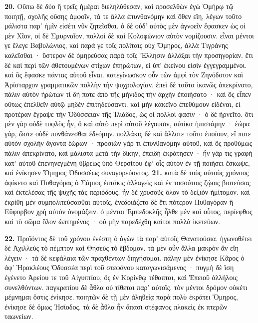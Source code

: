 \documentclass[a4paper, 11pt, oneside, polutonikogreek, german]{article}
\begin{document}
\textbf{20.} Οὔπω δὲ δύο ἢ τρεῖς ἡμέραι διεληλύθεσαν, καὶ προσελθὼν ἐγὼ Ὁμήρῳ τῷ ποιητῇ, σχολῆς οὔσης ἀμφοῖν, τά τε ἄλλα ἐπυνθανόμην καὶ ὅθεν εἴη, λέγων τοῦτο μάλιστα παρ' ἡμῖν εἰσέτι νῦν ζητεῖσθαι. ὁ δὲ οὐδ' αὐτὸς μὲν ἀγνοεῖν ἔφασκεν ὡς οἱ μὲν Χῖον, οἱ δὲ Σμυρναῖον, πολλοὶ δὲ καὶ Κολοφώνιον αὐτὸν νομίζουσιν. εἶναι μέντοι γε ἔλεγε Βαβυλώνιος, καὶ παρά γε τοῖς πολίταις οὐχ Ὅμηρος, ἀλλὰ Τιγράνης καλεῖσθαι · ὕστερον δὲ ὁμηρεύσας παρὰ τοῖς Ἕλλησιν ἀλλάξαι τὴν προσηγορίαν. ἔτι δὲ καὶ περὶ τῶν ἀθετουμένων στίχων ἐπηρώτων, εἰ ὑπ' ἐκείνου εἰσὶν ἐγγεγραμμένοι. καὶ ὃς ἔφασκε πάντας αὐτοῦ εἶναι. κατεγίνωσκον οὖν τῶν ἀμφὶ τὸν Ζηνόδοτον καὶ Ἀρίσταρχον γραμματικῶν πολλὴν τὴν ψυχρολογίαν. ἐπεὶ δὲ ταῦτα ἱκανῶς ἀπεκρίνατο, πάλιν αὐτὸν ἠρώτων τί δή ποτε ἀπὸ τῆς μήνιδος τὴν ἀρχὴν ἐποιήσατο · καὶ ὃς εἶπεν οὕτως ἐπελθεῖν αὐτῷ μηδὲν ἐπιτηδεύσαντι. καὶ μὴν κἀκεῖνο ἐπεθύμουν εἰδέναι, εἰ προτέραν ἔγραψε τὴν Ὀδύσσειαν τῆς Ἰλιάδος, ὡς οἱ πολλοί φασιν · ὁ δὲ ἠρνεῖτο. ὅτι μὲν γὰρ οὐδὲ τυφλὸς ἦν, ὃ καὶ αὐτὸ περὶ αὐτοῦ λέγουσιν, αὐτίκα ἠπιστάμην · ἑώρα γάρ, ὥστε οὐδὲ πυνθάνεσθαι ἐδεόμην. πολλάκις δὲ καὶ ἄλλοτε τοῦτο ἐποίουν, εἴ ποτε αὐτὸν σχολὴν ἄγοντα ἑώρων · προσιὼν γάρ τι ἐπυνθανόμην αὐτοῦ, καὶ ὃς προθύμως πάλιν ἀπεκρίνατο, καὶ μάλιστα μετὰ τὴν δίκην, ἐπειδὴ ἐκράτησεν · ἦν γάρ τις γραφὴ κατ' αὐτοῦ ἐπενηνεγμένη ὕβρεως ὑπὸ Θερσίτου ἐφ' οἷς αὐτὸν ἐν τῇ ποιήσει ἔσκωψε, καὶ ἐνίκησεν Ὅμηρος Ὀδυσσέως συναγορεύοντος. \textbf{21.} κατὰ δὲ τοὺς αὐτοὺς χρόνους ἀφίκετο καὶ Πυθαγόρας ὁ Σάμιος ἑπτάκις ἀλλαγεὶς καὶ ἐν τοσούτοις ζῴοις βιοτεύσας καὶ ἐκτελέσας τῆς ψυχῆς τὰς περιόδους. ἦν δὲ χρυσοῦς ὅλον τὸ δεξιὸν ἡμίτομον. καὶ ἐκρίθη μὲν συμπολιτεύσασθαι αὐτοῖς, ἐνεδοιάζετο δὲ ἔτι πότερον Πυθαγόραν ἢ Εὔφορβον χρὴ αὐτὸν ὀνομάζειν. ὁ μέντοι Ἐμπεδοκλῆς ἦλθε μὲν καὶ οὗτος, περίεφθος καὶ τὸ σῶμα ὅλον ὠπτημένος · οὐ μὴν παρεδέχθη καίτοι πολλὰ ἱκετεύων.

\textbf{22.} Προϊόντος δὲ τοῦ χρόνου ἐνέστη ὁ ἀγὼν τὰ παρ' αὐτοῖς Θανατούσια. ἠγωνοθέτει δὲ Ἀχιλλεὺς τὸ πέμπτον καὶ Θησεὺς τὸ ἕβδομον. τὰ μὲν οὖν ἄλλα μακρὸν ἂν εἴη λέγειν · τὰ δὲ κεφάλαια τῶν πραχθέντων διηγήσομαι. πάλην μὲν ἐνίκησε Κᾶρος ὁ ἀφ' Ἡρακλέους Ὀδυσσέα περὶ τοῦ στεφάνου καταγωνισάμενος · πυγμὴ δὲ ἴση ἐγένετο Ἀρείου τε τοῦ Αἰγυπτίου, ὃς ἐν Κορίνθῳ τέθαπται, καὶ Ἐπειοῦ ἀλλήλοις συνελθόντων. παγκρατίου δὲ ἆθλα οὐ τίθεται παρ' αὐτοῖς. τὸν μέντοι δρόμον οὐκέτι μέμνημαι ὅστις ἐνίκησε. ποιητῶν δὲ τῇ μὲν ἀληθείᾳ παρὰ πολὺ ἐκράτει Ὅμηρος, ἐνίκησε δὲ ὅμως Ἡσίοδος. τὰ δὲ ἆθλα ἦν ἅπασι στέφανος πλακεὶς ἐκ πτερῶν ταωνείων.
\end{document}
